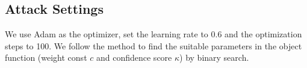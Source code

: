 \subsection{Attack Settings}
We use Adam \citep{Adam} as the optimizer, set the learning rate to 0.6 and the optimization steps to 100. We follow the \citet{cw} method to find the suitable parameters in the object function (weight const $c$ and confidence score $\kappa$) by binary search. 






